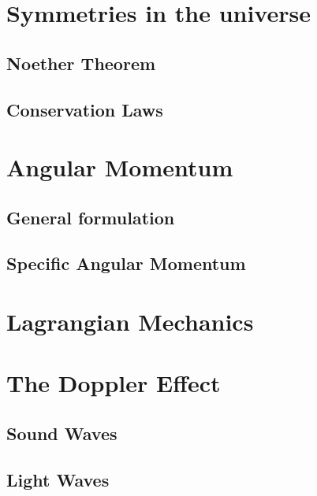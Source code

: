 \section{Symmetries in the universe}
\label{sec:symmetries}

\subsection{Noether Theorem}
\label{subsec:noether-theorem}

\subsection{Conservation Laws}
\label{subsec:conservation}

\section{Angular Momentum}
\label{sec:angular-momentum}

\subsection{General formulation}
\label{subsec:formulation-angular-momentum}

\subsection{Specific Angular Momentum}
\label{subsec:specific-angular-momentum}

\section{Lagrangian Mechanics}
\label{sec:lagrangian-mechanics}

\section{The Doppler Effect}
\label{sec:doppler}

\subsection{Sound Waves}
\label{subsec:sound-waves}

\subsection{Light Waves}
\label{subsec:light-waves}

